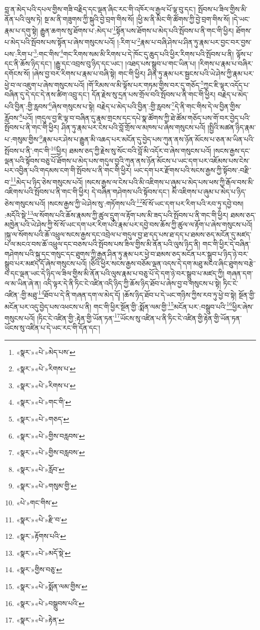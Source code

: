 བླ་ན་མེད་པའི་དཔལ་གྱིས་གཟི་བརྗིད་དང་ལྡན་ཞིང་རང་གི་འཁོར་ལ་རྒྱལ་པོ་ལྟ་བུ་དང་། སྤོབས་པ་ཟིལ་གྱིས་མི་ནོན་པའི་ལུས་ཏེ། སྔ་མ་ནི་གཟུགས་ཀྱི་སྐུའི་བྱེ་བྲག་གིས་སོ། །ཕྱི་མ་ནི་མིང་གི་ཚོགས་ཀྱི་བྱེ་བྲག་གིས་སོ། །དེ་ཡང་རྣམ་པ་དགུ་སྟེ། རྒྱུན་ཆགས་སུ་ཐོགས་པ་:མེད་པ་\footnote{«སྣར་»«པེ་»མེད་པས་}སྟོན་པས་ཐོགས་པ་མེད་པའི་སྤོབས་པ་ནི་གང་གི་ཕྱིར། ཐོགས་པ་མེད་པའི་སྤོབས་པས་སྟོན་པ་ཞེས་གསུངས་པའོ། །:རིག་པ་\footnote{«སྣར་»«པེ་»རིགས་པ་}རྣམ་པ་བཞི་ཤེས་པ་ཤིན་ཏུ་རྣམ་པར་བྱང་བར་བྱས་པས་:རིག་པ་\footnote{«སྣར་»«པེ་»རིགས་པ་}:གང་གིས་\footnote{«སྣར་»«པེ་»གང་གི་}གང་རིགས་སམ་མི་རིགས་པ་དེ་ཁོང་དུ་ཆུད་པའི་ཕྱིར་རིགས་པའི་སྤོབས་པ་ནི། ལྟོས་པ་དང་ནི་ཆོས་ཉིད་དང་། །རྒྱུ་དང་འབྲས་བུ་ཉིད་དང་ཡང་། །འཐད་པས་སྒྲུབ་པ་གང་ཡིན་པ། །རིགས་པ་རྣམ་པ་བཞིར་དགོངས་སོ། །ཞེས་བྱ་བར་རིགས་པ་རྣམ་པ་བཞི་སྟེ། གང་གི་ཕྱིར། ཤིན་ཏུ་རྣམ་པར་སྦྱངས་པའི་ཡེ་ཤེས་ཀྱི་རྣམ་པར་ཕྱེ་བ་ལ་འཇུག་པ་ཞེས་གསུངས་པའོ། །གོ་རིམས་ལ་མི་ལྟོས་པར་གཏམ་གྱིས་བར་དུ་གཅོད་\footnote{«སྣར་»«པེ་»གཅད་}ཀྱང་ཇི་ལྟར་འདོད་པ་བཞིན་དུ་དེ་དང་དེ་ནས་ཚིག་འབྲུ་དང་། དོན་རྗེས་སུ་དྲན་པས་གྲོལ་བའི་སྤོབས་པ་ནི་གང་གི་ཕྱིར། བརྗེད་པ་མེད་པའི་བྱིན་:གྱི་རླབས་\footnote{«སྣར་»«པེ་»གྱིས་བརླབས་}ཞེས་གསུངས་པ་སྟེ། བརྗེད་པ་མེད་པའི་བྱིན་:གྱི་རླབས་\footnote{«སྣར་»«པེ་»གྱིས་བརླབས་}དེ་ནི་གང་གིས་དེ་ལ་བྱིན་གྱིས་རློབས་\footnote{«སྣར་»«པེ་»རློབ་}པའོ། །གདུལ་བྱ་ཇི་ལྟ་བ་བཞིན་དུ་རྣམ་གྲངས་དང་དཔེ་སྣ་ཚོགས་ཀྱི་ཐེ་ཚོམ་གཅོད་པས་གོ་བར་བྱེད་པའི་སྤོབས་པ་ནི་གང་གི་ཕྱིར། ཤིན་ཏུ་རྣམ་པར་ངེས་པའི་བློ་གྲོས་ལ་མཁས་པ་ཞེས་གསུངས་པའོ། །སྤྱིའི་མཚན་ཉིད་རྣམ་པ་:གསུམ་གྱིས་\footnote{«སྣར་»«པེ་»གསུམ་གྱི་}རྣམ་པར་ཤེས་པ་རྒྱུན་མི་འཆད་པར་མངོན་དུ་བྱེད་པས་ཀུན་ནས་ཉོན་མོངས་པ་ཅན་མ་ཡིན་པའི་སྤོབས་པ་ནི་:གང་གི་\footnote{«པེ་»གང་གིས་}ཕྱིར། ཐམས་ཅད་ཀྱི་རྗེས་སུ་སོང་བའི་བློ་མི་འདོར་བ་ཞེས་གསུངས་པའོ། །སངས་རྒྱས་དང་ལྡན་པའི་སྟོབས་བཅུ་པོ་ཐོགས་པ་མེད་པས་གདུལ་བྱའི་ཀུན་ནས་ཉོན་མོངས་པ་ཡང་དག་པར་འཇོམས་པས་ངེས་པར་འབྱིན་པའི་གདམས་ངག་གི་སྤོབས་པ་ནི་གང་གི་ཕྱིར། ཡང་དག་པར་རྫོགས་པའི་སངས་རྒྱས་ཀྱི་སྟོབས་:བརྫི་བ་\footnote{«སྣར་»«པེ་»རྫི་བ་}མེད་པ་ཉིད་ཅེས་གསུངས་པའོ། །སངས་རྒྱས་ལ་ངེས་པའི་མི་འཇིགས་པ་ཞུམ་པ་མེད་པས་ཕས་ཀྱི་རྒོལ་བས་མི་འཇིགས་པའི་སྤོབས་པ་ནི་གང་གི་ཕྱིར། དེ་བཞིན་གཤེགས་པའི་སྟོབས་དང་། མི་འཇིགས་པ་ཞུམ་པ་མེད་པ་ཉིད་ཅེས་གསུངས་པའོ། །སངས་རྒྱས་ཀྱི་ཡེ་ཤེས་སུ་:གཏོགས་པའི་\footnote{«སྣར་»རྟོགས་པའི་}སོ་སོ་ཡང་དག་པར་རིག་པའི་རབ་ཏུ་དབྱེ་བས། :མདོའི་སྡེ་\footnote{«སྣར་»«པེ་»མདོ་སྡེ་}ལ་སོགས་པའི་ཆོས་རྣམས་ཀྱི་ཚུལ་དྲུག་ལ་རྟོག་པས་མི་ཟད་པའི་སྤོབས་པ་ནི་གང་གི་ཕྱིར། ཐམས་ཅད་མཁྱེན་པའི་ཡེ་ཤེས་ཀྱི་སོ་སོ་ཡང་དག་པར་རིག་པའི་རྣམ་པར་དབྱེ་བས་ཆོས་ཀྱི་ཚུལ་ལ་རྟོག་པ་ཞེས་གསུངས་པའོ། །སྐུ་ལ་སོགས་པའི་ཆོ་འཕྲུལ་སངས་རྒྱས་དང་འབྲེལ་པ་གདུལ་བྱ་ཐ་དད་པས་ཐ་དད་པ་ཐམས་ཅད་མངོན་དུ་མཛད་པ་ལ་མངའ་བས་ཆོ་འཕྲུལ་དང་བཅས་པའི་སྤོབས་པས་ཟིལ་གྱིས་མི་ནོན་པའི་ལུས་ཉིད་ནི། གང་གི་ཕྱིར་དེ་བཞིན་གཤེགས་པའི་སྐུ་དང་གསུང་དང་ཐུགས་ཀྱི་རྒྱན་ཤིན་ཏུ་རྣམ་པར་ཕྱེ་བ་ཐམས་ཅད་མངོན་པར་སྒྲུབ་པ་ཉིད་ཉེ་བར་སྒྲུབ་པར་མཛད་དོ་ཞེས་གསུངས་པའོ། །ཅིའི་ཕྱིར་སངས་རྒྱས་བཅོམ་ལྡན་འདས་དེ་དག་མཐུ་མངའ་ཞིང་ཐུགས་བརྩེ་བ་དང་ལྡན་ཡང་དེ་ཉིད་ལ་ཟིལ་གྱིས་མི་ནོན་པའི་ལུས་རྣམ་པ་བཅུ་པོ་དེ་དག་ཉེ་བར་སྒྲུབ་པ་མཛད་ཀྱི། གཞན་དག་ལ་མ་ཡིན་ཞེ་ན། འདི་ལྟར་དེ་ནི་ཏིང་ངེ་འཛིན་འདི་ཉིད་ཀྱི་ཆོས་ཉིད་ཐོབ་པ་ཞེས་བྱ་བ་གསུངས་པ་སྟེ། ཏིང་ངེ་འཛིན་:གྱི་མཐུ་\footnote{«སྣར་»གྱིས་བཅུ་}ཐོབ་པ་དེ་ནི་གཞན་དག་ལ་མེད་དོ། །ཆོས་ཉིད་ཐོབ་པ་དེ་ཡང་གཉིས་ཀྱིས་རབ་ཏུ་ཕྱེ་བ་སྟེ། སྔོན་གྱི་མངོན་པར་འདུ་བྱེད་པས་འཕངས་པ་ནི། གང་གི་ཕྱིར་སྔོན་གྱི་:སྨོན་ལམ་གྱི་\footnote{«སྣར་»«པེ་»སྨོན་ལམ་གྱིས་}མངོན་པར་:བསྒྲུབ་པའི་\footnote{«སྣར་»«པེ་»བསྒྲུབས་པའི་}ཕྱིར་ཞེས་གསུངས་པའོ། །ཏིང་ངེ་འཛིན་གྱི་:རྟེན་གྱི་ཡོན་ཏན་\footnote{«སྣར་»«པེ་»རྟེན་}ཡོངས་སུ་འཛིན་པ་ནི་ཏིང་ངེ་འཛིན་གྱི་རྟེན་གྱི་ཡོན་ཏན་ཡོངས་སུ་འཛིན་པ་དེ་ཡང་རང་གི་དོན་དང་། 